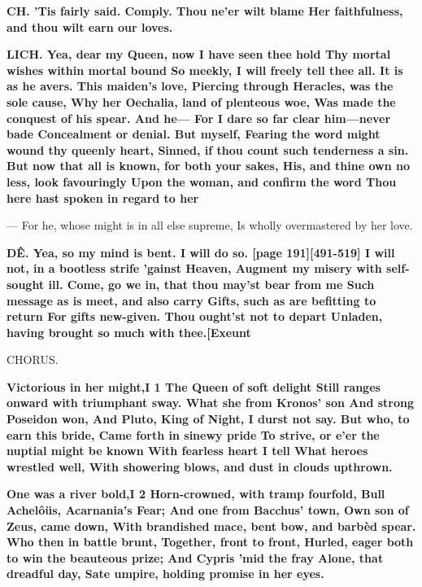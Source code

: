 \documentclass[11pt,letter]{book}
\begin{document}
\par \textbf{CH. ’Tis fairly said. Comply. Thou ne’er wilt blame Her faithfulness, and thou wilt earn our loves.}
\par 

\par \textbf{LICH. Yea, dear my Queen, now I have seen thee hold Thy mortal wishes within mortal bound So meekly, I will freely tell thee all. It is as he avers. This maiden’s love, Piercing through Heracles, was the sole cause, Why her Oechalia, land of plenteous woe, Was made the conquest of his spear. And he— For I dare so far clear him—never bade Concealment or denial. But myself, Fearing the word might wound thy queenly heart, Sinned, if thou count such tenderness a sin. But now that all is known, for both your sakes, His, and thine own no less, look favouringly Upon the woman, and confirm the word Thou here hast spoken in regard to her}
\par  — For he, whose might is in all else supreme, Is wholly overmastered by her love.

\par \textbf{DÊ. Yea, so my mind is bent. I will do so. [page 191][491-519] I will not, in a bootless strife ’gainst Heaven, Augment my misery with self-sought ill. Come, go we in, that thou may’st bear from me Such message as is meet, and also carry Gifts, such as are befitting to return For gifts new-given. Thou ought’st not to depart Unladen, having brought so much with thee.[Exeunt}
\par 

\par  CHORUS.

\par \textbf{Victorious in her might,I 1 The Queen of soft delight Still ranges onward with triumphant sway. What she from Kronos’ son And strong Poseidon won, And Pluto, King of Night, I durst not say. But who, to earn this bride, Came forth in sinewy pride To strive, or e’er the nuptial might be known With fearless heart I tell What heroes wrestled well, With showering blows, and dust in clouds upthrown.}
\par 

\par \textbf{One was a river bold,I 2 Horn-crowned, with tramp fourfold, Bull Achelôüs, Acarnania’s Fear; And one from Bacchus’ town, Own son of Zeus, came down, With brandished mace, bent bow, and barbèd spear. Who then in battle brunt, Together, front to front, Hurled, eager both to win the beauteous prize; And Cypris ’mid the fray Alone, that dreadful day, Sate umpire, holding promise in her eyes.}
\par 
\end{document}
